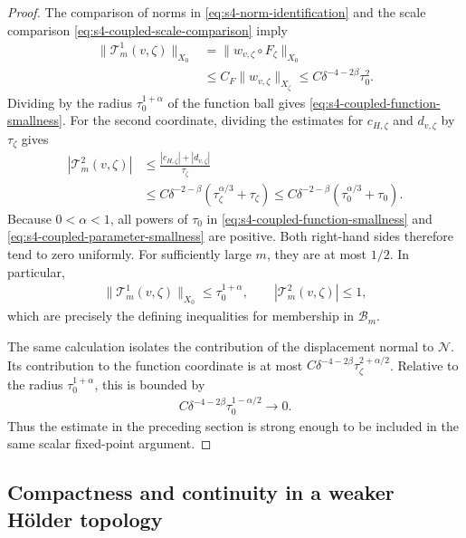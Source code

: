 \documentclass[a4paper,11pt,oneside,reqno]{amsart}
\numberwithin{equation}{section}
\theoremstyle{definition}
\begin{document}
\begin{proof}
    The comparison of norms in \eqref{eq:s4-norm-identification}
    and the scale comparison \eqref{eq:s4-coupled-scale-comparison}
    imply
    \begin{align*}
        \|\mathcal T_m^1(v,\zeta)\|_{X_0}
        &=\|w_{v,\zeta}\circ F_\zeta\|_{X_0}\\
        &\leq C_F\|w_{v,\zeta}\|_{X_\zeta}
        \leq C\delta^{-4-2\beta}\tau_0^2.
    \end{align*}
    Dividing by the radius $\tau_0^{1+\alpha}$ of the function
    ball gives \eqref{eq:s4-coupled-function-smallness}.
    For the second coordinate, dividing the estimates for
    $c_{H,\zeta}$ and $d_{v,\zeta}$ by $\tau_\zeta$ gives
    \begin{align*}
        |\mathcal T_m^2(v,\zeta)|
        &\leq\frac{|c_{H,\zeta}|+|d_{v,\zeta}|}{\tau_\zeta}\\
        &\leq C\delta^{-2-\beta}
        (\tau_\zeta^{\alpha/3}+\tau_\zeta)
        \leq C\delta^{-2-\beta}
        (\tau_0^{\alpha/3}+\tau_0).
    \end{align*}
    Because $0<\alpha<1$, all powers of $\tau_0$ in
    \eqref{eq:s4-coupled-function-smallness} and
    \eqref{eq:s4-coupled-parameter-smallness} are positive.
    Both right-hand sides therefore tend to zero uniformly.
    For sufficiently large $m$, they are at most $1/2$.
    In particular,
    \begin{align*}
        \|\mathcal T_m^1(v,\zeta)\|_{X_0}
        \leq\tau_0^{1+\alpha},
        \qquad
        |\mathcal T_m^2(v,\zeta)|\leq1,
    \end{align*}
    which are precisely the defining inequalities for
    membership in $\mathcal B_m$.

    The same calculation isolates the contribution of the
    displacement normal to $\mathcal N$. Its contribution to
    the function coordinate is at most
    $C\delta^{-4-2\beta}\tau_\zeta^{2+\alpha/2}$.
    Relative to the radius $\tau_0^{1+\alpha}$, this is bounded by
    \begin{align*}
        C\delta^{-4-2\beta}\tau_0^{1-\alpha/2}
        \rightarrow0.
    \end{align*}
    Thus the estimate in the preceding section is strong enough
    to be included in the same scalar fixed-point argument.
\end{proof}

\subsection{Compactness and continuity in a weaker H\"older topology}
\end{document}
